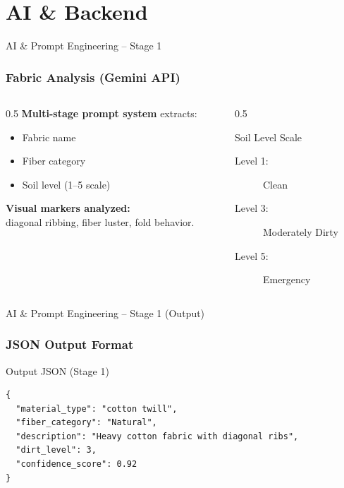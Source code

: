 \documentclass[aspectratio=169]{beamer}
\begin{document}
\section{AI \& Backend}

\begin{frame}[fragile]{AI \& Prompt Engineering – Stage 1}
\frametitle{Fabric Analysis (Gemini API)}
\small
\begin{columns}[T]
\begin{column}{0.5\textwidth}
\textbf{Multi-stage prompt system} extracts:
\begin{itemize}
    \item Fabric name
    \item Fiber category
    \item Soil level (1–5 scale)
\end{itemize}
\vspace{0.2cm}
\textbf{Visual markers analyzed:} \\ diagonal ribbing, fiber luster, fold behavior.
\end{column}
\begin{column}{0.5\textwidth}
\begin{block}{Soil Level Scale}
\footnotesize
\begin{description}
    \item[Level 1:] Clean
    \item[Level 3:] Moderately Dirty
    \item[Level 5:] Emergency
\end{description}
\end{block}
\end{column}
\end{columns}
\end{frame}

\begin{frame}[fragile]{AI \& Prompt Engineering – Stage 1 (Output)}
\frametitle{JSON Output Format}
\begin{block}{Output JSON (Stage 1)}
\begin{verbatim}
{
  "material_type": "cotton twill",
  "fiber_category": "Natural",
  "description": "Heavy cotton fabric with diagonal ribs",
  "dirt_level": 3,
  "confidence_score": 0.92
}
\end{verbatim}
\end{block}
\end{frame}
\end{document}
